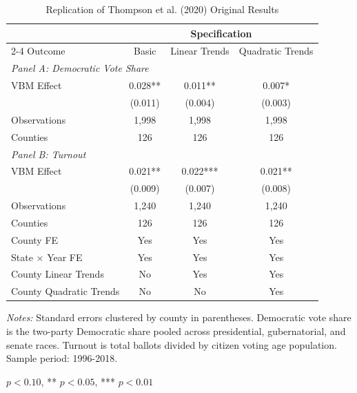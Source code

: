 
\begin{table}[htbp]
\centering
\caption{Replication of Thompson et al. (2020) Original Results}
\label{tab:replication}
\begin{tabular}{lccc}
\toprule
& \multicolumn{3}{c}{Specification} \\
\cmidrule(lr){2-4}
Outcome & Basic & Linear Trends & Quadratic Trends \\
\midrule
\multicolumn{4}{l}{\textit{Panel A: Democratic Vote Share}} \\[0.5em]
VBM Effect & 0.028** & 0.011** & 0.007* \\
& (0.011) & (0.004) & (0.003) \\
Observations & 1,998 & 1,998 & 1,998 \\
Counties & 126 & 126 & 126 \\[0.5em]
\multicolumn{4}{l}{\textit{Panel B: Turnout}} \\[0.5em]
VBM Effect & 0.021** & 0.022*** & 0.021** \\
& (0.009) & (0.007) & (0.008) \\
Observations & 1,240 & 1,240 & 1,240 \\
Counties & 126 & 126 & 126 \\
\midrule
County FE & Yes & Yes & Yes \\
State $\times$ Year FE & Yes & Yes & Yes \\
County Linear Trends & No & Yes & Yes \\
County Quadratic Trends & No & No & Yes \\
\bottomrule
\end{tabular}
\begin{tablenotes}
\small
\item \textit{Notes:} Standard errors clustered by county in parentheses. Democratic vote share is the two-party Democratic share pooled across presidential, gubernatorial, and senate races. Turnout is total ballots divided by citizen voting age population. Sample period: 1996-2018.
\item * $p<0.10$, ** $p<0.05$, *** $p<0.01$
\end{tablenotes}
\end{table}


